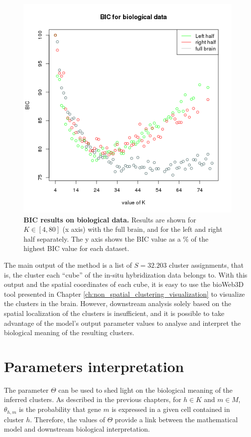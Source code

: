 	 
	
	\begin{figure}[h]
\centerline{\includegraphics[width=\linewidth]{gfx/chapter6/real_BIC.png}}
\caption{{\bf BIC results on biological data.} Results are shown for $K \in [4,80]$ (x axis) with the full brain, and for the left and right half separately. The y axis shows the BIC value as a \% of the highest BIC value for each dataset.}
\label{fig:realBIC}
	\end{figure} 
	
	
	The main output of the method is a list of $S=32.203$ cluster assignments, that is, the cluster each ``cube'' of the in-situ hybridization data belongs to. With this output and the spatial coordinates of each cube, it is easy to use the bioWeb3D tool presented in Chapter \ref{ch:non_spatial_clustering_visualization} to visualize the clusters in the brain. However, downstream analysis solely based on the spatial localization of the clusters is insufficient, and it is possible to take advantage of the model's output parameter values to analyse and interpret the biological meaning of the resulting clusters.

	\section{Parameters interpretation}
	The parameter $\Theta$ can be used to shed light on the biological meaning of the inferred clusters. As described in the previous chapters, for $h \in K$ and $m \in M$, $\hat{\theta_{h,m}}$ is the probability that gene $m$ is expressed in a given cell contained in cluster $h$. Therefore, the values of $\Theta$ provide a link between the mathematical model and downstream biological interpretation.\\
	
